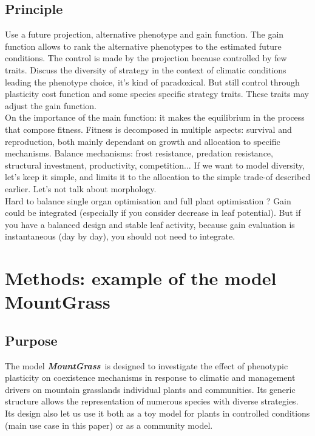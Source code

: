 \documentclass[review]{elsarticle}
\newcommand{\model}{\textbf{\textit{MountGrass}}~}
\begin{document}
\subsection{Principle}
Use a future projection, alternative phenotype and gain function. The gain function allows to rank the alternative phenotypes to the estimated future conditions. The control is made by the projection because controlled by few traits. Discuss the diversity of strategy in the context of climatic conditions leading the phenotype choice, it's kind of paradoxical. But still control through plasticity cost function and some species specific strategy traits. These traits may adjust the gain function. \\
On the importance of the main function: it makes the equilibrium in the process that compose fitness. Fitness is decomposed in multiple aspects: survival and reproduction, both mainly dependant on growth and allocation to specific mechanisms. Balance mechanisms: frost resistance, predation resistance, structural investment, productivity, competition... If we want to model diversity, let's keep it simple, and limits it to the allocation to the simple trade-of described earlier. Let's not talk about morphology.\\
Hard to balance single organ optimisation and full plant optimisation ? Gain could be integrated (especially if you consider decrease in leaf potential). But if you have a balanced design and stable leaf activity, because gain evaluation is instantaneous (day by day), you should not need to integrate.

\section{Methods: example of the model MountGrass}
\subsection{Purpose}
The model \model is designed to investigate the effect of phenotypic plasticity on coexistence mechanisms in response to climatic and management drivers on mountain grasslands individual plants and communities. Its generic structure allows the representation of numerous species with diverse strategies. Its design also let us use it both as a toy model for plants in controlled conditions (main use case in this paper) or as a community model.\\
\end{document}
